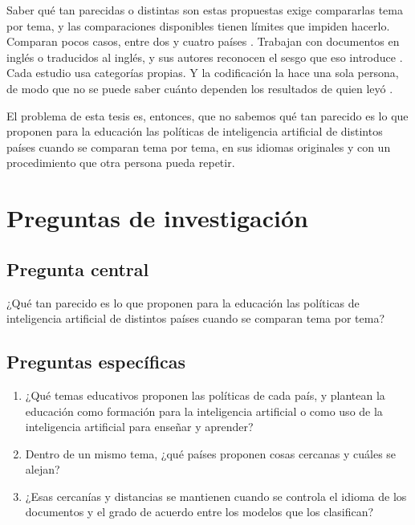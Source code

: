 Saber qué tan parecidas o distintas son estas propuestas exige compararlas tema por tema,
y las comparaciones disponibles tienen límites que impiden hacerlo. Comparan pocos casos,
entre dos y cuatro países \citep{kundu2025aipolicies, martinezrojas2026regulacion,
lara2026gobernanza}. Trabajan con documentos en inglés o traducidos al inglés, y sus
autores reconocen el sesgo que eso introduce \citep{jobin2019landscape,
schiff2022education}. Cada estudio usa categorías propias. Y la codificación la hace una
sola persona, de modo que no se puede saber cuánto dependen los resultados de quien leyó
\citep[p.~533]{schiff2022education}.

El problema de esta tesis es, entonces, que no sabemos qué tan parecido es lo que proponen
para la educación las políticas de inteligencia artificial de distintos países cuando se
comparan tema por tema, en sus idiomas originales y con un procedimiento que otra persona
pueda repetir.

\section{Preguntas de investigación}
\label{sec:preguntas}

\subsection{Pregunta central}

¿Qué tan parecido es lo que proponen para la educación las políticas de inteligencia
artificial de distintos países cuando se comparan tema por tema?

\subsection{Preguntas específicas}

\begin{enumerate}
  \item[\textbf{P1.}] ¿Qué temas educativos proponen las políticas de cada país, y plantean
  la educación como formación para la inteligencia artificial o como uso de la inteligencia
  artificial para enseñar y aprender?
  \item[\textbf{P2.}] Dentro de un mismo tema, ¿qué países proponen cosas cercanas y cuáles
  se alejan?
  \item[\textbf{P3.}] ¿Esas cercanías y distancias se mantienen cuando se controla el idioma
  de los documentos y el grado de acuerdo entre los modelos que los clasifican?
\end{enumerate}

